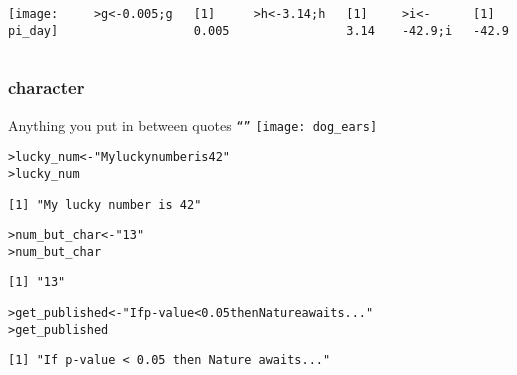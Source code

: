 \documentclass[13pt,aspectratio=169]{beamer}\usepackage[]{graphicx}\usepackage[]{color}
\makeatletter
\newcommand{\hlnum}[1]{\textcolor[rgb]{0.686,0.059,0.569}{#1}}%
\newcommand{\hlstr}[1]{\textcolor[rgb]{0.192,0.494,0.8}{#1}}%
\newcommand{\hlopt}[1]{\textcolor[rgb]{0,0,0}{#1}}%
\newcommand{\hlstd}[1]{\textcolor[rgb]{0.345,0.345,0.345}{#1}}%
\newcommand{\hlkwb}[1]{\textcolor[rgb]{0.69,0.353,0.396}{#1}}%
\newenvironment{kframe}{%
 \def\at@end@of@kframe{}%
 \ifinner\ifhmode%
  \def\at@end@of@kframe{\end{minipage}}%
  \begin{minipage}{\columnwidth}%
 \fi\fi%
 \def\FrameCommand##1{\hskip\@totalleftmargin \hskip-\fboxsep
 \colorbox{shadecolor}{##1}\hskip-\fboxsep
     \hskip-\linewidth \hskip-\@totalleftmargin \hskip\columnwidth}%
 \MakeFramed {\advance\hsize-\width
   \@totalleftmargin\z@ \linewidth\hsize
   \@setminipage}}%
 {\par\unskip\endMakeFramed%
 \at@end@of@kframe}
\newenvironment{knitrout}{}{} %
\renewcommand{\tt}[1]{\texttt{#1}}
\renewenvironment{knitrout}{\setlength{\topsep}{0mm}}{}
\makeatother
\begin{document}
\begin{frame}[fragile]
\begin{columns}[b]
    \texttt{[image: pi\_day]}
    \vskip6pt
\begin{knitrout}\small
{}\color{fgcolor}\begin{kframe}
\begin{alltt}
\hlstd{> }\hlstd{g} \hlkwb{<-} \hlnum{0.005}\hlstd{; g}
\end{alltt}
\begin{verbatim}
[1] 0.005
\end{verbatim}
\begin{alltt}
\hlstd{> }\hlstd{h} \hlkwb{<-} \hlnum{3.14}\hlstd{; h}
\end{alltt}
\begin{verbatim}
[1] 3.14
\end{verbatim}
\begin{alltt}
\hlstd{> }\hlstd{i} \hlkwb{<-} \hlopt{-}\hlnum{42.9}\hlstd{; i}
\end{alltt}
\begin{verbatim}
[1] -42.9
\end{verbatim}
\end{kframe}
\end{knitrout}
    \end{columns}
\end{frame}

\begin{frame}[fragile]
    \frametitle{character}
    Anything you put in between quotes \tt{``''} \hspace*{10mm}
    \texttt{[image: dog\_ears]}
\begin{knitrout}\small
{}\color{fgcolor}\begin{kframe}
\begin{alltt}
\hlstd{> }\hlstd{lucky_num} \hlkwb{<-} \hlstr{"My lucky number is 42"}
\hlstd{> }\hlstd{lucky_num}
\end{alltt}
\begin{verbatim}
[1] "My lucky number is 42"
\end{verbatim}
\begin{alltt}
\hlstd{> }\hlstd{num_but_char} \hlkwb{<-} \hlstr{"13"}
\hlstd{> }\hlstd{num_but_char}
\end{alltt}
\begin{verbatim}
[1] "13"
\end{verbatim}
\begin{alltt}
\hlstd{> }\hlstd{get_published} \hlkwb{<-} \hlstr{"If p-value < 0.05 then Nature awaits..."}
\hlstd{> }\hlstd{get_published}
\end{alltt}
\begin{verbatim}
[1] "If p-value < 0.05 then Nature awaits..."
\end{verbatim}
\end{kframe}
\end{knitrout}
\end{frame}
\end{document}
